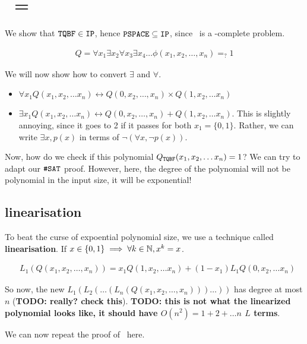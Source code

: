 \section{\ip~= \pspace}

We show that $\texttt{TQBF} \in \texttt{IP}$, hence $\texttt{PSPACE} \subseteq \texttt{IP}$, since \tqbf~is
a \pspace-complete problem.


\begin{align*}
Q = \forall x_1 \exists x_2 \forall x_3 \exists x_4 \dots \phi(x_1, x_2, \dots, x_n) =_? 1
\end{align*}

We will now show how to convert $\exists$ and $\forall$.

\begin{itemize}
\item $\forall x_1 Q(x_1, x_2, \dots x_n) \leftrightarrow Q(0, x_2, \dots, x_n) \times Q(1, x_2, \dots x_n)$
\item $\exists x_1 Q(x_1, x_2, \dots x_n) \leftrightarrow Q(0, x_2, \dots, x_n) + Q(1, x_2, \dots x_n)$. This
is slightly annoying, since it goes to 2 if it passes for both $x_1 = \{0, 1\}$. Rather, we can write
$\exists x, p(x)$ in terms of $\lnot (\forall x, \lnot p(x))$.
\end{itemize}


Now, how do we check if this polynomial $Q_{\texttt{TQBF}}(x_1, x_2, \dots x_n) = 1$?
We can try to adapt our $\texttt{\#SAT}$ proof. However, here, the degree of the
polynomial will not be polynomial in the input size, it will be exponential!

\subsection{linearisation}
To beat the curse of expoential polynomial size, we use a technique called
\textbf{linearisation}. If $x \in \{0, 1\} \implies \forall k \in \mathbb{N}, x^k = x$.

\begin{align*}
&L_1(Q(x_1, x_2, \dots, x_n)) = x_1 Q(1, x_2, \dots x_n) + (1 - x_1) L_1Q(0, x_2, \dots x_n)
\end{align*}

So now, the new $L_1 (L_2 (\dots (L_n (Q(x_1, x_2, \dots, x_n)))\dots))$ has degree at most $n$ (\textbf{TODO: really? check this}). \textbf{TODO: this is not what the linearized polynomial looks like, it should have
$O(n^2) = 1 + 2 + \dots n$ $L$ terms}.

We can now repeat the proof of \hashsat~here.

